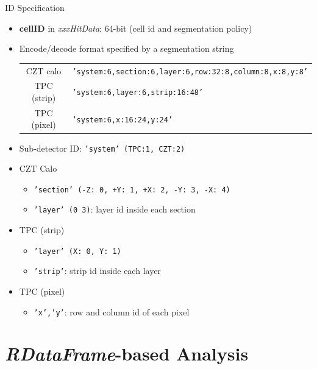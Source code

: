 \documentclass[11pt,t,aspectratio=169]{beamer}
\begin{document}
\begin{frame}[c]{ID Specification}
  \begin{itemize}
  \item \textbf{cellID} in \textit{xxxHitData}: 64-bit (cell id and segmentation policy)
  \item Encode/decode format specified by a segmentation string\\
    \begin{tabular}[l]{ c | l }
      CZT calo & \texttt{'system:6,section:6,layer:6,row:32:8,column:8,x:8,y:8'}\\
      TPC (strip) & \texttt{'system:6,layer:6,strip:16:48'}\\
      TPC (pixel) & \texttt{'system:6,x:16:24,y:24'}\\
    \end{tabular}
  \item Sub-detector ID: \texttt{'system' (TPC:1, CZT:2)}
  \item CZT Calo
    \begin{itemize}
    \item \texttt{'section' (-Z: 0, +Y: 1, +X: 2, -Y: 3, -X: 4)}
    \item \texttt{'layer' (0~3)}: layer id inside each section
    \end{itemize}
  \item TPC (strip)
    \begin{itemize}
    \item \texttt{'layer' (X: 0, Y: 1)}
    \item \texttt{'strip'}: strip id inside each layer
    \end{itemize}
  \item TPC (pixel)
    \begin{itemize}
    \item \texttt{'x','y'}: row and column id of each pixel
    \end{itemize}
  \end{itemize}

\end{frame}

\section{\textit{RDataFrame}-based Analysis}
\end{document}
